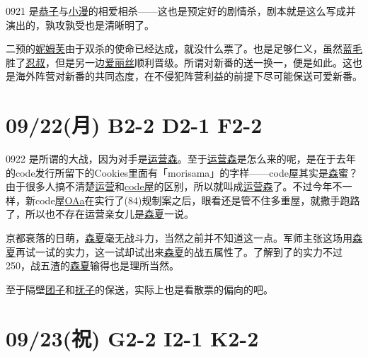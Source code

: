 0921 是\uline{恭子}与\uline{小漫}的相爱相杀——这也是预定好的剧情杀，剧本就是这么写成并演出的，孰攻孰受也是清晰明了。

二预的\uline{妮姆芙}由于双杀的使命已经达成，就没什么票了。也是足够仁义，虽然\uline{蓝毛}胜了\uline{忍叔}，但是另一边\uline{爱丽丝}顺利晋级。所谓对新番的送一换一，便是如此。这也是海外阵营对新番的共同态度，在不侵犯阵营利益的前提下尽可能保送可爱新番。

\section{09/22(月) B2-2 D2-1 F2-2}


0922 是所谓的大战，因为对手是\uline{运营森}。至于\uline{运营森}是怎么来的呢，是在于去年的code发行所留下的Cookies里面有「morisama」的字样——code屋其实是\uline{森}蜜？由于很多人搞不清楚\uline{运营}和\uline{code屋}的区别，所以就叫成\uline{运营森}了。不过今年不一样，新code屋\uline{OAa}在实行了(84)规制案之后，眼看还是管不住多重屋，就撒手跑路了，所以也不存在运营亲女儿是\uline{森夏}一说。

京都衰落的日萌，\uline{森夏}毫无战斗力，当然之前并不知道这一点。军师主张这场用\uline{森夏}再试一试的实力，这一试却试出来\uline{森夏}的战五属性了。了解到了的实力不过250，战五渣的\uline{森夏}输得也是理所当然。

至于隔壁\uline{团子}和\uline{抚子}的保送，实际上也是看散票的偏向的吧。

\section{09/23(祝) G2-2 I2-1 K2-2}


